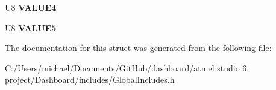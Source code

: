 \begin{DoxyCompactItemize}
\item 
\hypertarget{struct_dashboard___r_x__general__un_1_1_dashboard___r_x__st_acfc140c0a5e197d948d60701724bd43b}{U8 {\bfseries V\-A\-L\-U\-E4}}\label{struct_dashboard___r_x__general__un_1_1_dashboard___r_x__st_acfc140c0a5e197d948d60701724bd43b}

\item 
\hypertarget{struct_dashboard___r_x__general__un_1_1_dashboard___r_x__st_a47006ccd80481c1fcfce55d7cb75bf0a}{U8 {\bfseries V\-A\-L\-U\-E5}}\label{struct_dashboard___r_x__general__un_1_1_dashboard___r_x__st_a47006ccd80481c1fcfce55d7cb75bf0a}

\end{DoxyCompactItemize}


The documentation for this struct was generated from the following file\-:\begin{DoxyCompactItemize}
\item 
C\-:/\-Users/michael/\-Documents/\-Git\-Hub/dashboard/atmel studio 6. project/\-Dashboard/includes/Global\-Includes.\-h\end{DoxyCompactItemize}
